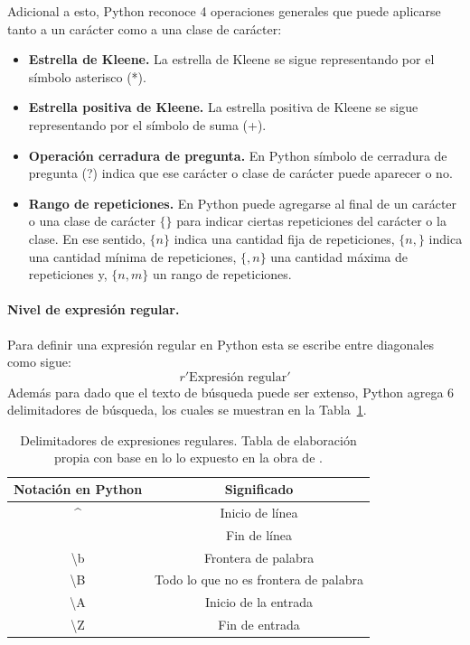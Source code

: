 Adicional a esto, Python reconoce 4 operaciones generales que puede aplicarse tanto a un carácter como a una clase de carácter:
\begin{itemize}
	\item \textbf{Estrella de Kleene.} La estrella de Kleene se sigue representando por el símbolo asterisco (*).
	
	\item \textbf{Estrella positiva de Kleene.} La estrella positiva de Kleene se sigue representando por el símbolo de suma (+).
	
	\item \textbf{Operación cerradura de pregunta.} En Python símbolo de cerradura de pregunta (?) indica que ese carácter o clase de carácter puede aparecer o no.
	
	\item \textbf{Rango de repeticiones.} En Python puede agregarse al final de un carácter o una clase de carácter $\lbrace\rbrace$ para indicar ciertas repeticiones del carácter o la clase. En ese sentido, $\lbrace n\rbrace$ indica una cantidad fija de repeticiones,  $\lbrace n,\rbrace$ indica una cantidad mínima de repeticiones,  $\lbrace,n\rbrace$ una cantidad máxima de repeticiones y,  $\lbrace n,m\rbrace$ un rango de repeticiones.
\end{itemize}

\paragraph{Nivel de expresión regular.} Para definir una expresión regular en Python esta se escribe entre diagonales como sigue: $$r'\mbox{Expresión regular}'$$
Además para dado que el texto de búsqueda puede ser extenso, Python agrega 6 delimitadores de búsqueda, los cuales se muestran en la Tabla~\ref{tb:redelims}. 
\begin{table}[h]
	\centering
	\caption{Delimitadores de expresiones regulares. Tabla de elaboración propia con base en lo lo expuesto en la obra de \cite{lopez2014mastering}. }
	\label{tb:redelims}
	\begin{tabular}{|c|c|}
		\hline
		\textbf{Notación en Python} & \textbf{Significado}   \\ \hline
		\textasciicircum                    & Inicio de línea         \\ \hline
		\textdollar    & Fin de línea                \\ \hline
		\textbackslash{}b    & Frontera de palabra        \\ \hline
		\textbackslash{}B    & Todo lo que no es frontera de palabra    \\ \hline
		\textbackslash{}A    & Inicio de la entrada \\ \hline
		\textbackslash{}Z    & Fin de entrada         \\ \hline
	\end{tabular}
\end{table}

